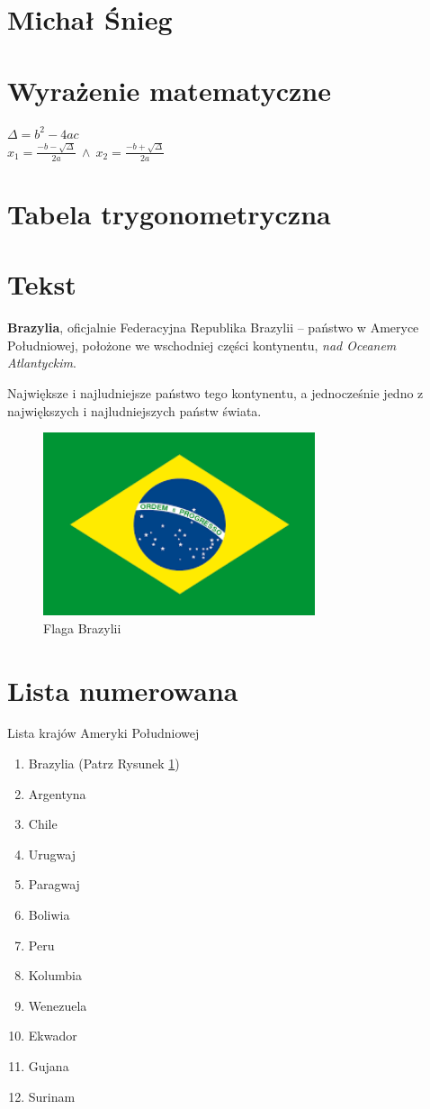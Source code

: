 \section*{Michał Śnieg}

\section{Wyrażenie matematyczne}
$\Delta=b^2-4ac$ \\
$x_1=\frac{-b-\sqrt{\Delta}}{2a} \ \land \ x_2=\frac{-b+\sqrt{\Delta}}{2a}$

\section{Tabela trygonometryczna}


\section{Tekst}
\textbf{Brazylia}, oficjalnie Federacyjna Republika Brazylii – państwo w Ameryce Południowej, położone we wschodniej części kontynentu, \textit{nad Oceanem Atlantyckim}. 

Największe i najludniejsze państwo tego kontynentu, a jednocześnie jedno z największych i najludniejszych państw świata.

\begin{figure}[htbp]
    \centering
    \includegraphics[width=8cm]{pictures/flaga.png}
    \caption{Flaga Brazylii}
    \label{fig:flaga}
\end{figure}

\section{Lista numerowana}
Lista krajów Ameryki Południowej
\begin{enumerate}
    \item Brazylia (Patrz Rysunek \ref{fig:flaga})
    \item Argentyna
    \item Chile
    \item Urugwaj
    \item Paragwaj
    \item Boliwia
    \item Peru
    \item Kolumbia
    \item Wenezuela
    \item Ekwador
    \item Gujana
    \item Surinam
\end{enumerate}

